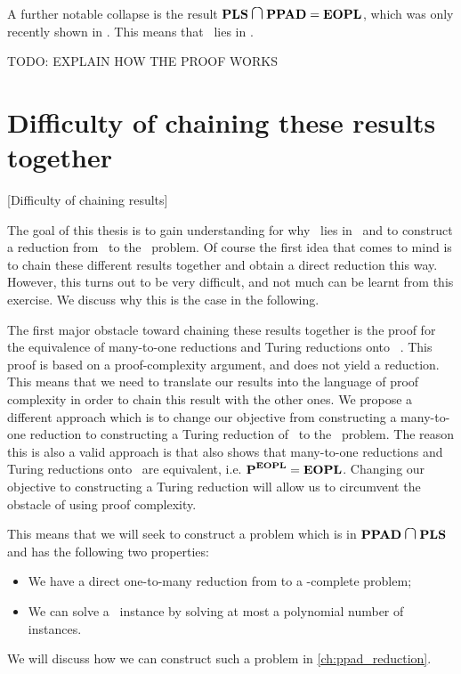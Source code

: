 A further notable collapse is the result $\PLS \medcap \PPAD = \EOPL$, which was only recently shown in . This means that \Tarski\ lies in \EOPL.

TODO: EXPLAIN HOW THE PROOF WORKS

\section{Difficulty of chaining these results together}[Difficulty of chaining results]

The goal of this thesis is to gain understanding for why \Tarski\ lies in \EOPL\ and to construct a reduction from \Tarski\ to the \EndOfPotentialLine\ problem. Of course the first idea that comes to mind is to chain these different results together and obtain a direct reduction this way. However, this turns out to be very difficult, and not much can be learnt from this exercise. We discuss why this is the case in the following.

The first major obstacle toward chaining these results together is the proof for the equivalence of many-to-one reductions and Turing reductions onto \PPAD\ . This proof is based on a proof-complexity argument, and does not yield a reduction. This means that we need to translate our results into the language of proof complexity in order to chain this result with the other ones. We propose a different approach which is to change our objective from constructing a many-to-one reduction to constructing a Turing reduction of \Tarski\ to the \EndOfPotentialLine\ problem. The reason this is also a valid approach is that  also shows that many-to-one reductions and Turing reductions onto \EOPL\ are equivalent, i.e. $\textbf{P}^{\textbf{EOPL}} = \textbf{EOPL}$. Changing our objective to constructing a Turing reduction will allow us to circumvent the obstacle of using proof complexity.

This means that we will seek to construct a problem \Tarskistar which is in $\PPAD  \medcap \PLS$ and has the following two properties:
\begin{itemize}
	\item We have a direct one-to-many reduction from \Tarskistar to a \PPAD-complete problem;
	\item We can solve a \Tarski\ instance by solving at most a polynomial number of \Tarskistar instances.
\end{itemize}
We will discuss how we can construct such a \Tarskistar problem in \cref{ch:ppad_reduction}.

